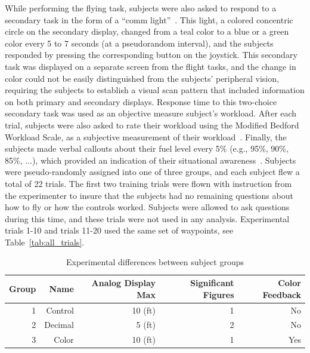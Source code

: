 \documentclass[]{aiaa-tc}%
\begin{document}
While performing the flying task, subjects were also asked to respond to a secondary task in the form of a ``comm light''~\cite{crosby1979dual, wickens1986sternberg, hainley2013pilot}. This light, a colored concentric circle on the secondary display, changed from a teal color to a blue or a green color every 5 to 7 seconds (at a pseudorandom interval), and the subjects responded by pressing the corresponding button on the joystick. This secondary task was displayed on a separate screen from the flight tasks, and the change in color could not be easily distinguished from the subjects' peripheral vision, requiring the subjects to establish a visual scan pattern that included information on both primary and secondary displays. Response time to this two-choice secondary task was used as an objective measure subject's workload. After each trial, subjects were also asked to rate their workload using the Modified Bedford Workload Scale, as a subjective measurement of their workload~\cite{wickens1991processing}. Finally, the subjects made verbal callouts about their fuel level every 5\% (e.g., 95\%, 90\%, 85\%, ...), which provided an indication of their situational awareness~\cite{endsley1995toward, jones2000examining}. Subjects were pseudo-randomly assigned into one of three groups, and each subject flew a total of 22 trials. The first two training trials were flown with instruction from the experimenter to insure that the subjects had no remaining questions about how to fly or how the controls worked. Subjects were allowed to ask questions during this time, and these trials were not used in any analysis. Experimental trials 1-10 and trials 11-20 used the same set of waypoints, see Table~\ref{tab:all_trials}.

\begin{table}[tb!]
  \centering
  \begin{tabular}{rrrrr}
    \toprule
    Group & Name    & Analog Display Max & Significant Figures & Color Feedback \\
    \midrule
    1     & Control & 10 (ft)            & 1                   & No             \\
    2     & Decimal & 5 (ft)             & 2                   & No             \\
    3     & Color   & 10 (ft)            & 1                   & Yes            \\
    \bottomrule
  \end{tabular}
  \caption{Experimental differences between subject groups}
  \label{tab:group_diffs}
\end{table}
\end{document}
